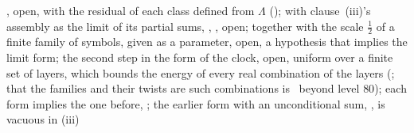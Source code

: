 {\raggedright{}, open, with the residual of each class defined
from $\Lambda$ ();
with clause~(iii)'s assembly as the limit of its
partial sums,
,
, open;
together with the scale $\tfrac12$ of a finite family
of symbols, given as a parameter,
open, a hypothesis that implies the limit form; the
second step in the form of the clock,
open, uniform over a finite set of layers, which
bounds the energy of every real combination of the
layers
(; that the families and their twists are such
combinations is \ beyond level $80$); each form implies the one before,
; the earlier form with an unconditional sum,
, is
vacuous in (iii)\par}


